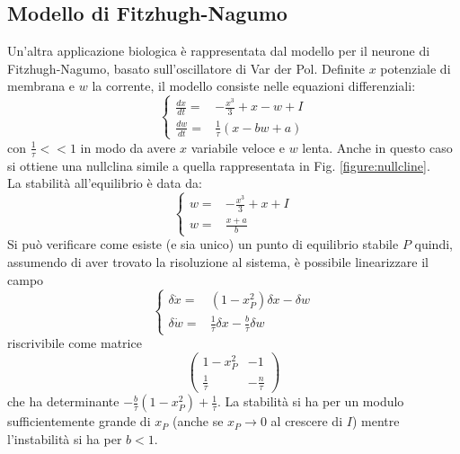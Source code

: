 \documentclass[12pt, a4paper]{book}
\theoremstyle{theorem}
\begin{document}
			\subsection{Modello di Fitzhugh-Nagumo}
				Un'altra applicazione biologica è rappresentata dal modello per il neurone di Fitzhugh-Nagumo, basato sull'oscillatore di Var der Pol.
				Definite $x$ potenziale di membrana e $w$ la corrente, il modello consiste nelle equazioni differenziali:
				\begin{equation}
					\begin{cases}
						\frac{dx}{dt}=&-\frac{x^3}{3}+x-w+I\\
						\frac{dw}{dt}=&\frac{1}{\tau}\left(x-bw+a\right)
					\end{cases}
					\label{equation:fitzhugh_nagumo}
				\end{equation}
				con $\frac{1}{\tau}<<1$ in modo da avere $x$ variabile veloce e $w$ lenta.
				Anche in questo caso si ottiene una nullclina simile a quella rappresentata in Fig. \ref{figure:nullcline}.\\
				La stabilità all'equilibrio è data da:
				\begin{equation*}
					\begin{cases}
						w=&-\frac{x^3}{3}+x+I\\
						w=&\frac{x+a}{b}
					\end{cases}
				\end{equation*}
				Si può verificare come esiste (e sia unico) un punto di equilibrio stabile $P$ quindi, assumendo di aver trovato la risoluzione al sistema, è possibile linearizzare il campo
				\begin{equation*}
					\begin{cases}
						\delta\dot{x}=&\left(1-x_P^2\right)\delta x - \delta w\\
						\delta\dot{w}=&\frac{1}{\tau}\delta x -\frac{b}{\tau}\delta w
					\end{cases}
				\end{equation*}
				riscrivibile come matrice
				\begin{equation*}
					\left(
					\begin{matrix}
						1-x_P^2 & -1\\
						\frac{1}{\tau} & -\frac{n}{\tau}
					\end{matrix}
					\right)
				\end{equation*}
				che ha determinante $-\frac{b}{\tau}\left(1-x_P^2\right)+\frac{1}{\tau}$.
				La stabilità si ha per un modulo sufficientemente grande di $x_P$ (anche se $x_P\to 0$ al crescere di $I$) mentre l'instabilità si ha per $b<1$.
\end{document}
